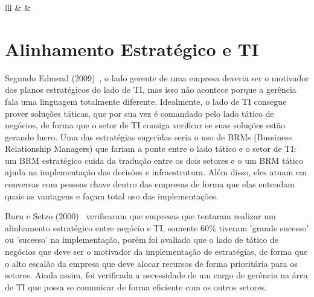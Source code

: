 \documentclass[review]{elsarticle}
\begin{document}
\begin{table}[]
\begin{tabular}{lll}
		 &  &                                \\ \hline
	\end{tabular}
	\caption{Definições de Estratégia, segundo os 5 Ps da Estratégia. \cite{Sobrosa2009}}
	
	\label{tabela_strat}
\end{table}

\section{Alinhamento Estratégico e TI}
Segundo Edmead (2009)~\cite{Edmead2016}, o lado gerente de uma empresa deveria ser o motivador dos planos estratégicos do lado de TI, mas isso não acontece porque a gerência fala uma linguagem totalmente diferente. Idealmente, o lado de TI consegue prover soluções táticas, que por sua vez é comandado pelo lado tático de negócios, de forma que o setor de TI consiga verificar se suas soluções estão gerando lucro. Uma das estratégias sugeridas seria o uso de BRMs (Bussiness Relationship Managers) que fariam a ponte entre o lado tático e o setor de TI: um BRM estratégico cuida da tradução entre os dois setores e o um BRM tático ajuda na implementação das decisões e infraestrutura. Além disso, eles atuam em conversas com pessoas chave dentro das empresas de forma que elas entendam quais as vantagens e façam total uso das implementações.

Burn e Setzo (2000)~\cite{BURN2000197} verificaram que empresas que tentaram realizar um alinhamento estratégico entre negócio e TI, somente 60{\%} tiveram 'grande sucesso' ou 'sucesso' na implementação, porém foi avaliado que o lado de tático de negócios que deve ser o motivador da implementação de estratégias, de forma que o alto escalão da empresa que deve alocar recursos de forma prioritária para os setores. Ainda assim, foi verificada a necessidade de um cargo de gerência na área de TI que possa se comunicar de forma eficiente com os outros setores. 
\end{document}
